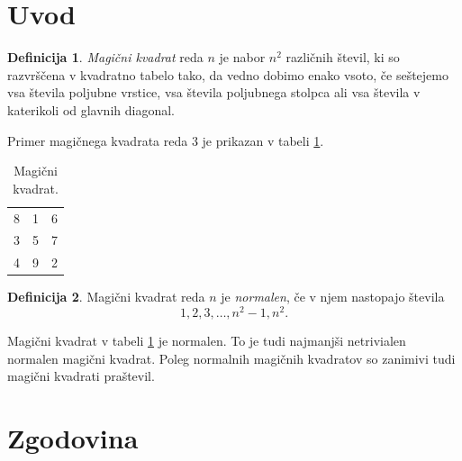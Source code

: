 \documentclass[a4paper,12pt]{article}
\theoremstyle{definition}
\newtheorem{definicija}{Definicija}
\theoremstyle{plain}
\newcommand{\pojem}[1]{\emph{\color{purple}#1}}
\begin{document}
\newpage

\section{Uvod}

\begin{definicija}
   \emph{ \color{purple}Magični kvadrat} reda $n$ je nabor $n^2$ različnih števil,
   ki so razvrščena v kvadratno tabelo tako, da vedno dobimo enako vsoto,
   če seštejemo vsa števila poljubne vrstice, vsa števila poljubnega
   stolpca ali vsa števila v katerikoli od glavnih diagonal.
\end{definicija}

Primer magičnega kvadrata reda 3 je prikazan v tabeli \ref{tab:magicni_kvadrat}.

\begin{table}[!ht]
   \centering
   \caption{Magični kvadrat.}
   \label{tab:magicni_kvadrat}
   \large %
   \begin{tabular}{ccc}
       8 & 1 & 6 \\
       3 & 5 & 7 \\
       4 & 9 & 2 \\
   \end{tabular}
   \normalsize %
\end{table}

\begin{definicija}
   Magični kvadrat reda $n$ je \pojem{normalen}, če v njem nastopajo števila
   \begin{equation}
      1, 2, 3, \ldots, n^2-1, n^2.
      \label{eq:numbers}
   \end{equation}
\end{definicija}

Magični kvadrat v tabeli \ref{tab:magicni_kvadrat} je normalen.
To je tudi najmanjši netrivialen normalen magični kvadrat.
Poleg normalnih magičnih kvadratov so zanimivi tudi magični kvadrati praštevil.


\section{Zgodovina}
\end{document}
